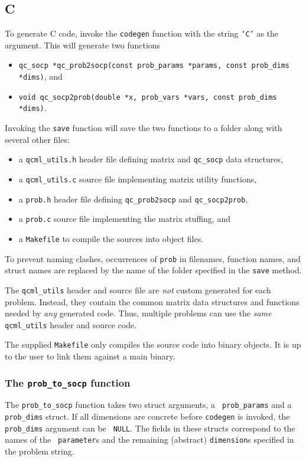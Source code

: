 \documentclass[11pt]{article}
\begin{document}
\subsection{C}
To generate C code, invoke the {\tt codegen} function with the string
{\tt `C'} as the argument. This will generate two functions
\begin{itemize}
\item {\tt qc\_socp *qc\_prob2socp(const prob\_params *params, const prob\_dims *dims)}, and
\item {\tt void qc\_socp2prob(double *x, prob\_vars *vars, const prob\_dims *dims)}.
\end{itemize}
Invoking the {\tt save} function will save the two functions to a folder along
with several other files:
\begin{itemize}
  \item a {\tt qcml\_utils.h} header file defining matrix and {\tt qc\_socp} data structures,
  \item a {\tt qcml\_utils.c} source file implementing matrix utility functions,
  \item a {\tt prob.h} header file defining {\tt qc\_prob2socp} and {\tt qc\_socp2prob},
  \item a {\tt prob.c} source file implementing the matrix stuffing, and
  \item a {\tt Makefile} to compile the sources into object files.
\end{itemize}
To prevent naming clashes, occurrences of {\tt prob} in filenames, function
names, and struct names are replaced by the name of the folder specified in
the {\tt save} method.

The {\tt qcml\_utils} header and source file are \emph{not} custom generated
for each problem. Instead, they contain the common matrix data structures and
functions needed by \emph{any} generated code. Thus, multiple problems can
use the \emph{same} {\tt qcml\_utils} header and source code.

The supplied {\tt Makefile} only compiles the source code into binary objects.
It is up to the user to link them against a main binary.


\subsubsection{The {\tt prob\_to\_socp} function}
The {\tt prob\_to\_socp} function takes two struct arguments, a {\tt
prob\_params} and a {\tt prob\_dims} struct. If all dimensions are concrete
before {\tt codegen} is invoked, the {\tt prob\_dims} argument can be {\tt
NULL}. The fields in these structs correspond to the names of the {\tt
parameter}s and the remaining (abstract) {\tt dimension}s specified in the
problem string.
\end{document}
